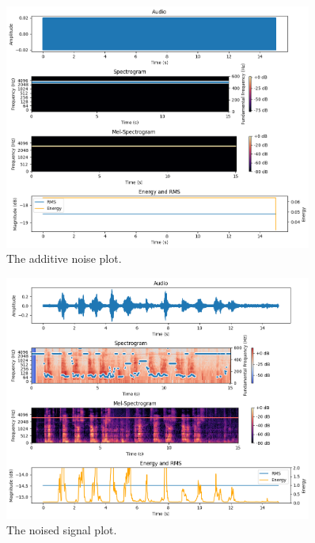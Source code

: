 \begin{figure}
  \centering
  \includegraphics[width=0.9\textwidth]{noise_plot.png}
  \caption{The additive noise plot.}
\end{figure}

\begin{figure}
  \centering
  \includegraphics[width=0.9\textwidth]{noised_downsampled_plot.png}
  \caption{The noised signal plot.}
\end{figure}


